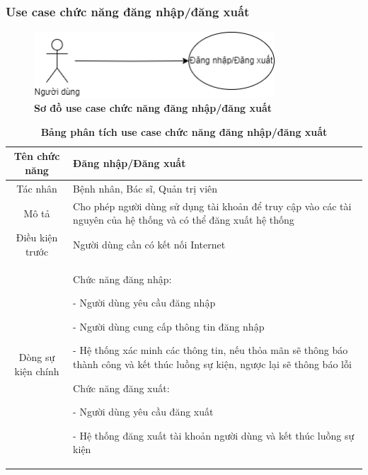 \subsubsection{Use case chức năng đăng nhập/đăng xuất}
  \begin{figure}[H]
    \centering
    \includegraphics[width=9cm,height=2.5cm]{Images/use_case/use_case_login.png}
    \caption[Sơ đồ use case chức năng đăng nhập/đăng xuất]{\bfseries \fontsize{12pt}{0pt}
    \selectfont Sơ đồ use case chức năng đăng nhập/đăng xuất}
    \label{use_case_login_logout} %
  \end{figure}

  \begin{table}[H]
    \caption{\bfseries \fontsize{12pt}{0pt}\selectfont Bảng phân tích use case chức năng đăng nhập/đăng xuất}
    \centering
    \begin{tabularx}{0.9\textwidth}{|c|X|}
      \hline
      \textbf{Tên chức năng} & \textbf{Đăng nhập/Đăng xuất} \\
      \hline
      Tác nhân & Bệnh nhân, Bác sĩ, Quản trị viên \\
      \hline
      Mô tả & Cho phép người dùng sử dụng tài khoản để truy cập vào các tài nguyên của hệ thống và có thể đăng xuất hệ thống
       \\
      \hline
      Điều kiện trước & Người dùng cần có kết nối Internet \\
      \hline
      Dòng sự kiện chính & 
        Chức năng đăng nhập:

        - Người dùng yêu cầu đăng nhập

        - Người dùng cung cấp thông tin đăng nhập

        - Hệ thống xác minh các thông tin, nếu thỏa mãn sẽ thông báo thành công và kết thúc luồng sự kiện, ngược lại 
        sẽ thông báo lỗi 

        Chức năng đăng xuất:

        - Người dùng yêu cầu đăng xuất

        - Hệ thống đăng xuất tài khoản người dùng và kết thúc luồng sự kiện
        \\
      \hline
    \end{tabularx}
  \end{table}

